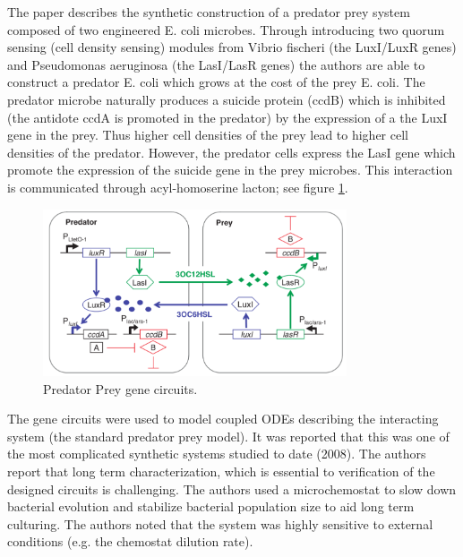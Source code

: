 \documentclass[float=false, crop=false]{standalone}
\begin{document}
	The paper \cite{Balagadde2008} describes the synthetic construction of a predator prey system composed of two engineered E. coli microbes. Through introducing two quorum sensing (cell density sensing) modules from Vibrio fischeri (the LuxI/LuxR genes) and Pseudomonas aeruginosa (the LasI/LasR genes) the authors are able to construct a predator E. coli which grows at the cost of the prey E. coli. The predator microbe naturally produces a suicide protein (ccdB) which is inhibited (the antidote ccdA is promoted in the predator) by the expression of a the LuxI gene in the prey. Thus higher cell densities of the prey lead to higher cell densities of the predator. However, the predator cells express the LasI gene which promote the expression of the suicide gene in the prey microbes. This interaction is communicated through acyl-homoserine lacton; see figure \ref{fig:balagadde2008_genecircuits}.  
	\begin{figure}[h]
		\centering
		\includegraphics[width=0.8\textwidth]{balagadde2008_genecircuits.png}
		\caption{Predator Prey gene circuits.}
		\label{fig:balagadde2008_genecircuits}
	\end{figure}
	The gene circuits were used to model coupled ODEs describing the interacting system (the standard predator prey model). It was reported that this was one of the most complicated synthetic systems studied to date (2008). The authors report that long term characterization, which is essential to verification of the designed circuits is challenging. The authors used a microchemostat to slow down bacterial evolution and stabilize bacterial population size to aid long term culturing. The authors noted that the system was highly sensitive to external conditions (e.g. the chemostat dilution rate). 

	\ifstandalone
			
		
	\fi
	
\end{document}
